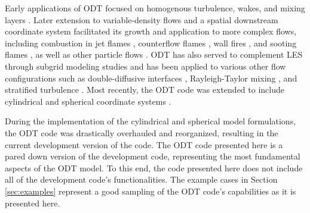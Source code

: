 \documentclass[preprint,12pt, a4paper]{elsarticle}
\begin{document}
Early applications of ODT focused on homogenous turbulence, wakes, and mixing layers \cite{Kerstein_1999,Kerstein_2000,Kerstein_2001}. Later extension to variable-density flows and a spatial downstream coordinate system facilitated its growth and application to more complex flows, including combustion in jet flames \cite{Echekki_2001,Hewson_2001,Hewson_2002,Lignell_2012,Punati_2011,Abdelsamie_2017,Lignell_2017, Goshayeshi_2015}, counterflow flames \cite{Jozefik_2015}, wall fires \cite{Monson_2016}, and sooting flames \cite{Lignell_2015,Hewson_2006,Hewson_2009,Lignell_2015b,Ricks_2010}, as well as other particle flows \cite{Sun_2017,Schmidt_2009,Sun_2014,Fistler_2017}. ODT has also served to complement LES through subgrid modeling studies \cite{Cao_2008,Schmidt_2003,Schmidt_2010} and has been applied to various other flow configurations such as double-diffusive interfaces \cite{GonzalezJuez_2011}, Rayleigh-Taylor mixing \cite{GonzalezJuez_2013}, and stratified turbulence \cite{Wunsch_2001}. Most recently, the ODT code was extended to include cylindrical and spherical coordinate systems \cite{Lignell_2018,Klein_2018,Klein_2019}.

During the implementation of the cylindrical and spherical model formulations, the ODT code was drastically overhauled and reorganized, resulting in the current development version of the code. The ODT code presented here is a pared down version of the development code, representing the most fundamental aspects of the ODT model. To this end, the code presented here does not include all of the development code's functionalities. The example cases in Section \ref{sec:examples} represent a good sampling of the ODT code's capabilities as it is presented here.  

\end{document}
